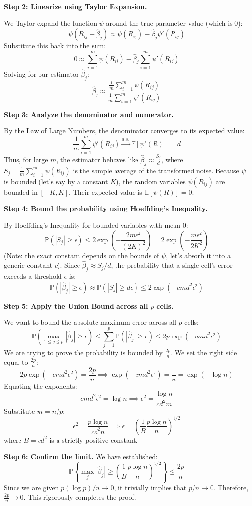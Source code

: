 \begin{solution}
\textbf{Step 2: Linearize using Taylor Expansion.}

We Taylor expand the function $\psi$ around the true parameter value (which is 0):
\[ \psi(R_{ij} - \hat{\beta}_j) \approx \psi(R_{ij}) - \hat{\beta}_j \psi'(R_{ij}) \]
Substitute this back into the sum:
\[ 0 \approx \sum_{i=1}^m \psi(R_{ij}) - \hat{\beta}_j \sum_{i=1}^m \psi'(R_{ij}) \]
Solving for our estimator $\hat{\beta}_j$:
\[ \hat{\beta}_j \approx \frac{\frac{1}{m} \sum_{i=1}^m \psi(R_{ij})}{\frac{1}{m} \sum_{i=1}^m \psi'(R_{ij})} \]

\textbf{Step 3: Analyze the denominator and numerator.}

By the Law of Large Numbers, the denominator converges to its expected value:
\[ \frac{1}{m} \sum_{i=1}^m \psi'(R_{ij}) \xrightarrow{a.s.} \mathbb{E}[\psi'(R)] = d \]
Thus, for large $m$, the estimator behaves like $\hat{\beta}_j \approx \frac{S_j}{d}$, where $S_j = \frac{1}{m} \sum_{i=1}^m \psi(R_{ij})$ is the sample average of the transformed noise.
Because $\psi$ is bounded (let's say by a constant $K$), the random variables $\psi(R_{ij})$ are bounded in $[-K, K]$. Their expected value is $\mathbb{E}[\psi(R)] = 0$.

\textbf{Step 4: Bound the probability using Hoeffding's Inequality.}

By Hoeffding's Inequality for bounded variables with mean 0:
\[ \mathbb{P}(|S_j| \geq \epsilon) \leq 2 \exp\left( -\frac{2m \epsilon^2}{(2K)^2} \right) = 2 \exp\left( -\frac{m \epsilon^2}{2K^2} \right) \]
(Note: the exact constant depends on the bounds of $\psi$, let's absorb it into a generic constant $c$).
Since $\hat{\beta}_j \approx S_j / d$, the probability that a single cell's error exceeds a threshold $\epsilon$ is:
\[ \mathbb{P}(|\hat{\beta}_j| \geq \epsilon) \approx \mathbb{P}(|S_j| \geq d \epsilon) \leq 2 \exp\left( -c m d^2 \epsilon^2 \right) \]

\textbf{Step 5: Apply the Union Bound across all $p$ cells.}

We want to bound the absolute maximum error across all $p$ cells:
\[ \mathbb{P}\left(\max_{1 \leq j \leq p} |\hat{\beta}_j| \geq \epsilon\right) \leq \sum_{j=1}^p \mathbb{P}(|\hat{\beta}_j| \geq \epsilon) \leq 2p \exp\left( -c m d^2 \epsilon^2 \right) \]
We are trying to prove the probability is bounded by $\frac{2p}{n}$. We set the right side equal to $\frac{2p}{n}$:
\[ 2p \exp\left( -c m d^2 \epsilon^2 \right) = \frac{2p}{n} \implies \exp\left( -c m d^2 \epsilon^2 \right) = \frac{1}{n} = \exp(-\log n) \]
Equating the exponents:
\[ c m d^2 \epsilon^2 = \log n \implies \epsilon^2 = \frac{\log n}{c d^2 m} \]
Substitute $m = n/p$:
\[ \epsilon^2 = \frac{p \log n}{c d^2 n} \implies \epsilon = \left( \frac{1}{B} \frac{p \log n}{n} \right)^{1/2} \]
where $B = c d^2$ is a strictly positive constant.

\textbf{Step 6: Confirm the limit.}
We have established:
\[ \mathbb{P}\left\{ \max_j |\hat{\beta}_j| \geq \left(\frac{1}{B}\frac{p\log n}{n}\right)^{1/2} \right\} \leq \frac{2p}{n} \]
Since we are given $p(\log p)/n \to 0$, it trivially implies that $p/n \to 0$.
Therefore, $\frac{2p}{n} \to 0$. This rigorously completes the proof.
\end{solution}
